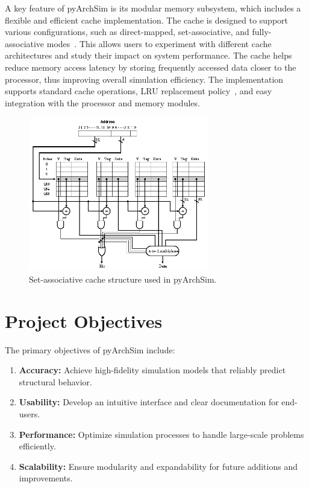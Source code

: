 \documentclass[12pt,a4paper]{report}
\begin{document}
A key feature of pyArchSim is its modular memory subsystem, which includes a flexible and efficient cache implementation. The cache is designed to support various configurations, such as direct-mapped, set-associative, and fully-associative modes~\cite{sciencedirect_set_associative}. This allows users to experiment with different cache architectures and study their impact on system performance. The cache helps reduce memory access latency by storing frequently accessed data closer to the processor, thus improving overall simulation efficiency. The implementation supports standard cache operations, LRU replacement policy~\cite{gfg_lru_cache}, and easy integration with the processor and memory modules.

\begin{figure}[h!]
  \centering
  \includegraphics[width=0.7\textwidth]{figs/set_associative_cache.jpg}
  \caption{Set-associative cache structure used in pyArchSim.}
  \label{fig:set_associative_cache}
\end{figure}

\section{Project Objectives}
The primary objectives of pyArchSim include:
\begin{enumerate}
  \item \textbf{Accuracy:} Achieve high-fidelity simulation models that reliably predict structural behavior.
  \item \textbf{Usability:} Develop an intuitive interface and clear documentation for end-users.
  \item \textbf{Performance:} Optimize simulation processes to handle large-scale problems efficiently.
  \item \textbf{Scalability:} Ensure modularity and expandability for future additions and improvements.
\end{enumerate}
\end{document}
